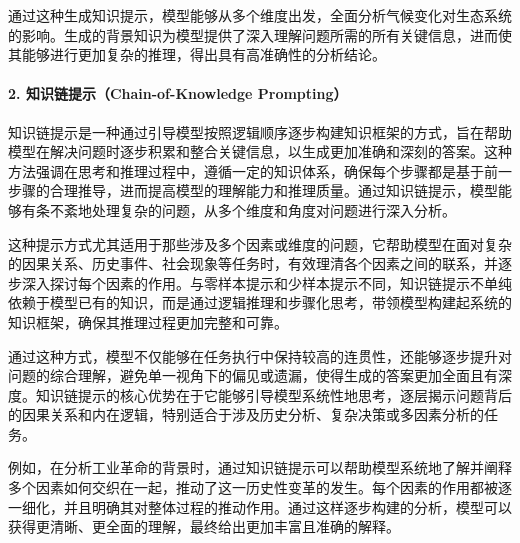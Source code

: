 通过这种生成知识提示，模型能够从多个维度出发，全面分析气候变化对生态系统的影响。生成的背景知识为模型提供了深入理解问题所需的所有关键信息，进而使其能够进行更加复杂的推理，得出具有高准确性的分析结论。

\paragraph{2. 知识链提示（Chain-of-Knowledge Prompting）} 

知识链提示是一种通过引导模型按照逻辑顺序逐步构建知识框架的方式，旨在帮助模型在解决问题时逐步积累和整合关键信息，以生成更加准确和深刻的答案。这种方法强调在思考和推理过程中，遵循一定的知识体系，确保每个步骤都是基于前一步骤的合理推导，进而提高模型的理解能力和推理质量。通过知识链提示，模型能够有条不紊地处理复杂的问题，从多个维度和角度对问题进行深入分析。

这种提示方式尤其适用于那些涉及多个因素或维度的问题，它帮助模型在面对复杂的因果关系、历史事件、社会现象等任务时，有效理清各个因素之间的联系，并逐步深入探讨每个因素的作用。与零样本提示和少样本提示不同，知识链提示不单纯依赖于模型已有的知识，而是通过逻辑推理和步骤化思考，带领模型构建起系统的知识框架，确保其推理过程更加完整和可靠。

通过这种方式，模型不仅能够在任务执行中保持较高的连贯性，还能够逐步提升对问题的综合理解，避免单一视角下的偏见或遗漏，使得生成的答案更加全面且有深度。知识链提示的核心优势在于它能够引导模型系统性地思考，逐层揭示问题背后的因果关系和内在逻辑，特别适合于涉及历史分析、复杂决策或多因素分析的任务。

例如，在分析工业革命的背景时，通过知识链提示可以帮助模型系统地了解并阐释多个因素如何交织在一起，推动了这一历史性变革的发生。每个因素的作用都被逐一细化，并且明确其对整体过程的推动作用。通过这样逐步构建的分析，模型可以获得更清晰、更全面的理解，最终给出更加丰富且准确的解释。



